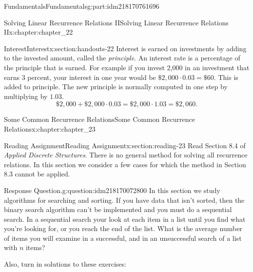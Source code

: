 \documentclass[oneside,10pt,]{book}
\numberwithin{equation}{section}
\begin{document}
\begin{partptx}{Fundamentals}{}{Fundamentals}{}{}{g:part:idm218170761696}
\begin{chapterptx}{Solving Linear Recurrence Relations II}{}{Solving Linear Recurrence Relations II}{}{}{x:chapter:chapter_22}
%
%
\typeout{************************************************}
\typeout{************************************************}
%
\begin{sectionptx}{Interest}{}{Interest}{}{}{x:section:handouts-22}
Interest is earned on investments by adding to the invested amount, called the \emph{principle}. An interest rate is a percentage of the principle that is earned.  For example if you invest \textdollar{}2,000 in an investment  that earns 3 percent, your interest in one year would be \(\$2,000\cdot 0.03 =\$60\).  This is added to principle.  The new principle is normally computed in one step by multiplying by \(1.03\).%
\begin{equation*}
\$2,000+ \$2,000\cdot 0.03 =\$2,000\cdot 1.03 =  \$2,060.
\end{equation*}
%
\end{sectionptx}
\end{chapterptx}
%
\typeout{************************************************}
\typeout{************************************************}
%
\begin{chapterptx}{Some Common Recurrence Relations}{}{Some Common Recurrence Relations}{}{}{x:chapter:chapter_23}
\index{}%
%
%
\typeout{************************************************}
\typeout{************************************************}
%
\begin{sectionptx}{Reading Assignment}{}{Reading Assignment}{}{}{x:section:reading-23}
Read Section 8.4 of \emph{Applied Discrete Structures}. There is no general method for solving all recurrence relations.  In this section we consider a few cases for which the method in Section 8.3 cannot be applied.%
\begin{question}{Response Question.}{g:question:idm218170072800}%
In this section we study algorithms for searching and sorting.  If you have data that isn't sorted, then the binary search algorithm can't be implemented and you must do a sequential search. In a sequential search your look at each item in a list until you find what you're looking for, or you reach the end of the list.  What is the average number of items you will examine in a successful, and in an unsuccessful search of a list with \(n\) items?%
\end{question}
Also, turn in solutions to these exercises:%
%
%
\typeout{************************************************}
\typeout{************************************************}

\end{sectionptx}
\end{chapterptx}
\end{partptx}
\end{document}
